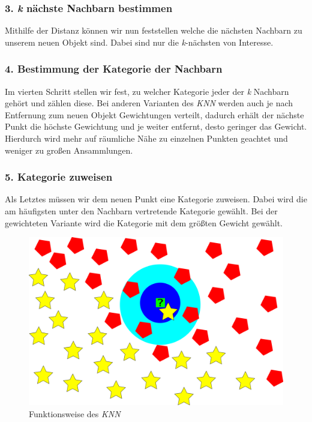 \subsubsection{3. \textit{k} nächste Nachbarn bestimmen}
Mithilfe der Distanz können wir nun feststellen welche die nächsten Nachbarn zu unserem neuen Objekt sind. Dabei sind nur die \textit{k}-nächsten von Interesse.

\subsubsection{4. Bestimmung der Kategorie der Nachbarn}
Im vierten Schritt stellen wir fest, zu welcher Kategorie jeder der \textit{k} Nachbarn gehört und zählen diese. Bei anderen Varianten des \textit{KNN} werden auch je nach Entfernung zum neuen Objekt Gewichtungen verteilt, dadurch erhält der nächste Punkt die höchste Gewichtung und je weiter entfernt, desto geringer das Gewicht. Hierdurch wird mehr auf räumliche Nähe zu einzelnen Punkten geachtet und weniger zu großen Ansammlungen.

\subsubsection{5. Kategorie zuweisen}
Als Letztes müssen wir dem neuen Punkt eine Kategorie zuweisen. Dabei wird die am häufigsten unter den Nachbarn vertretende Kategorie gewählt. Bei der gewichteten Variante wird die Kategorie mit dem größten Gewicht gewählt.\cite{script_korn}\par

\begin{figure}[H]
    \centering
    \includegraphics[width=\imgMed]{images/theory/knn.png}
    \caption{Funktionsweise des \textit{KNN}}
    \label{fig:knn_function}
\end{figure}

